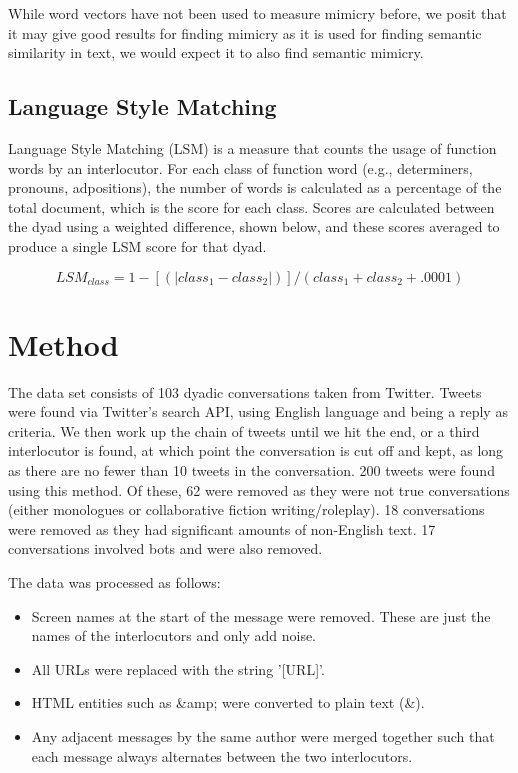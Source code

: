 \documentclass[conference]{IEEEtran}
\begin{document}
While word vectors have not been used to measure mimicry before, we posit that it may give good results for finding mimicry as it is used for finding semantic similarity in text, we would expect it to also find semantic mimicry.


\subsection{Language Style Matching}
Language Style Matching (LSM) \cite{ireland2010language} is a measure that counts the usage of function words by an interlocutor. For each class of function word (e.g., determiners, pronouns, adpositions), the number of words is  calculated as a percentage of the total document, which is the score for each class. Scores are calculated between the dyad using a weighted difference, shown below, and these scores averaged to produce a single LSM score for that dyad.

\[ LSM_{class} = 1 - [(|class_1 - class_2|)] / (class_1 + class_2 + .0001) \]


\section{Method}
The data set consists of 103 dyadic conversations taken from Twitter. Tweets were found via Twitter's  search API, using English language and being a reply as criteria. We then work up the chain of tweets  until we hit the end, or a third interlocutor is found, at which point the conversation is cut off and  kept, as long as there are no fewer than 10 tweets in the conversation. 200 tweets were found using  this method. Of these, 62 were removed as they were not true conversations (either monologues or  collaborative fiction writing/roleplay). 18 conversations were removed as they had significant amounts  of non-English text. 17 conversations involved bots and were also removed.

The data was processed as follows:
\begin{itemize}
	\item Screen names at the start of the message were removed. These are just the names of the 
		  interlocutors and only add noise.
	\item All URLs were replaced with the string '[URL]'.
	\item HTML entities such as \&amp; were converted to plain text (\&).
	\item Any adjacent messages by the same author were merged together such that each message always
	      alternates between the two interlocutors.
\end{itemize}
\end{document}
